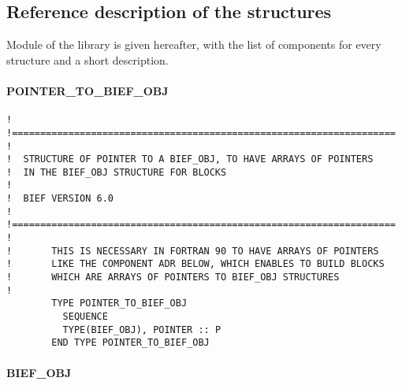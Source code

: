 \subsection{Reference description of the structures}

Module  of the library is given hereafter, with the list of
components for every structure and a short description.

\paragraph{POINTER\_TO\_BIEF\_OBJ}

\begin{lstlisting}[language=TelFortran]
!
!====================================================================
!
!  STRUCTURE OF POINTER TO A BIEF_OBJ, TO HAVE ARRAYS OF POINTERS
!  IN THE BIEF_OBJ STRUCTURE FOR BLOCKS
!
!  BIEF VERSION 6.0
!
!====================================================================
!
!       THIS IS NECESSARY IN FORTRAN 90 TO HAVE ARRAYS OF POINTERS
!       LIKE THE COMPONENT ADR BELOW, WHICH ENABLES TO BUILD BLOCKS
!       WHICH ARE ARRAYS OF POINTERS TO BIEF_OBJ STRUCTURES
!
        TYPE POINTER_TO_BIEF_OBJ
          SEQUENCE
          TYPE(BIEF_OBJ), POINTER :: P
        END TYPE POINTER_TO_BIEF_OBJ
\end{lstlisting}


\paragraph{BIEF\_OBJ}

